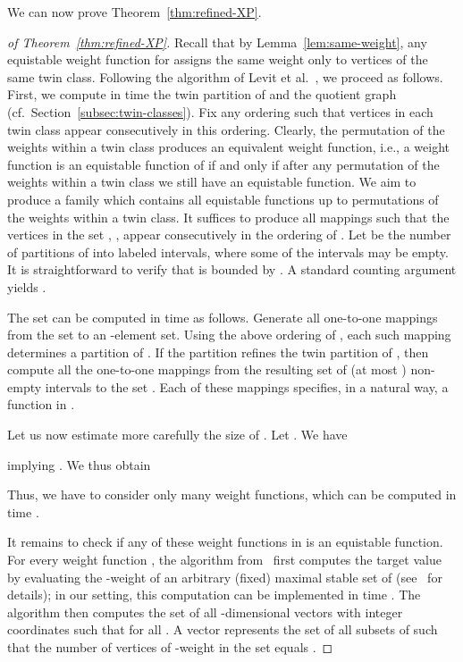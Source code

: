 \documentclass{llncs}
\begin{document}
We can now prove Theorem~\ref{thm:refined-XP}.

\begin{proof}[of Theorem~\ref{thm:refined-XP}]
Recall that by Lemma~\ref{lem:same-weight}, any equistable weight function for  assigns the same weight only to vertices of the same twin class. Following the algorithm of Levit et al.~\cite{MR3040147}, we proceed as follows.
First, we compute in time  the twin partition of 
and the quotient graph  (cf.~Section~\ref{subsec:twin-classes}).
Fix any ordering  such that vertices in each twin class appear consecutively in this ordering. Clearly, the permutation of the weights within a twin class produces an equivalent weight function, i.e., a weight function is an equistable function of  if and only if after any permutation of the weights within a twin class we still have an equistable function. We aim to produce a family  which contains all equistable functions up to permutations of the weights within a twin class. It suffices to produce all mappings  such that the vertices in the set , , appear consecutively in the ordering of . Let  be the number of partitions of  into  labeled intervals, where some of the intervals may be empty. It is straightforward to verify that  is bounded by .
A standard counting argument yields .

The set  can be computed in time  as follows.
Generate all one-to-one mappings from the set  to an -element set. Using the above ordering of ,
each such mapping determines a partition of . If the partition refines the twin partition of , then compute all the  one-to-one mappings from the resulting set of (at most ) non-empty intervals to the set . Each of these mappings specifies, in a natural way, a function in .

Let us now estimate more carefully the size of . Let . We have

implying .
We thus obtain

Thus, we have to consider only  many weight functions, which
can be computed in time
.

It remains to check if any of these  weight functions in  is an equistable function.
For every weight function , the algorithm from~\cite{MR3040147} first computes the target value 
by evaluating the -weight of an arbitrary (fixed) maximal stable set of  (see~\cite{MR3040147} for details);
in our setting, this computation can be implemented in time .
The algorithm then computes the set  of all -dimensional vectors  with integer coordinates such that
 for all . A vector  represents the set of all subsets of  such that
the number of vertices of -weight  in the set equals .


\end{proof}
\end{document}
